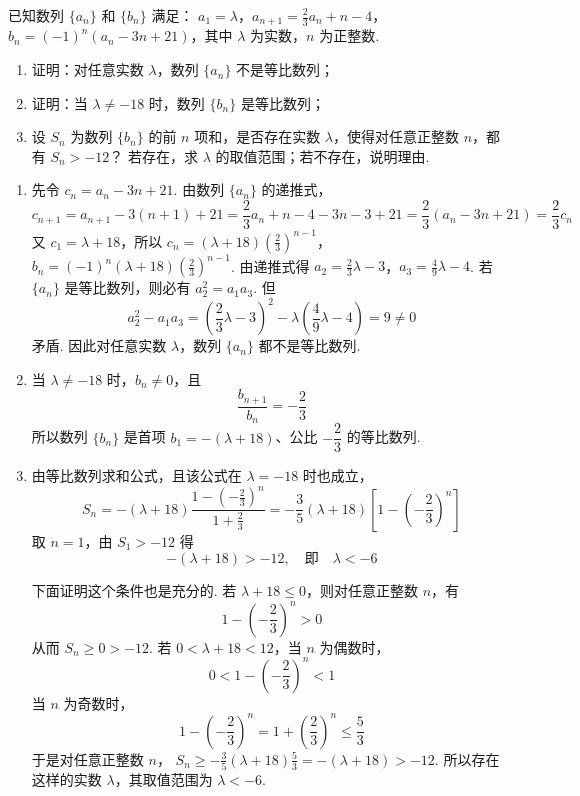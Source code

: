 \begin{problem}
已知数列 \(\{a_{n}\}\) 和 \(\{b_{n}\}\) 满足： \(a_1 = \lambda\)，\(a_{n + 1} = \frac{2}{3} a_n + n - 4\)，\(b_n = (-1)^n (a_n - 3n + 21)\)，其中 \(\lambda\) 为实数，\(n\) 为正整数.
\begin{enumerate}
\item 证明：对任意实数 \(\lambda\)，数列 \(\{a_{n}\}\) 不是等比数列；
\item 证明：当 \(\lambda \neq -18\) 时，数列 \(\{b_n\}\) 是等比数列；
\item 设 \(S_{n}\) 为数列 \(\{b_{n}\}\) 的前 \(n\) 项和，是否存在实数 \(\lambda\)，使得对任意正整数 \(n\)，都有 \(S_{n} > -12\)？ 若存在，求 \(\lambda\) 的取值范围；若不存在，说明理由.
\end{enumerate}
\end{problem}

\begin{solution}
\begin{enumerate}
\item 先令 \(c_n=a_n-3n+21\). 由数列 \(\{a_n\}\) 的递推式，
\[
c_{n+1}=a_{n+1}-3(n+1)+21
=\frac{2}{3}a_n+n-4-3n-3+21
=\frac{2}{3}(a_n-3n+21)=\frac{2}{3}c_n
\]
又 \(c_1=\lambda+18\)，所以
\(c_n=(\lambda+18)\left(\frac{2}{3}\right)^{n-1}\)，\(b_n=(-1)^n(\lambda+18)\left(\frac{2}{3}\right)^{n-1}\).
由递推式得
\(a_2=\frac{2}{3}\lambda-3\)，\(a_3=\frac{4}{9}\lambda-4\).
若 \(\{a_n\}\) 是等比数列，则必有 \(a_2^2=a_1a_3\). 但
\[
a_2^2-a_1a_3=\left(\frac{2}{3}\lambda-3\right)^2-\lambda\left(\frac{4}{9}\lambda-4\right)=9\ne0
\]
矛盾. 因此对任意实数 \(\lambda\)，数列 \(\{a_n\}\) 都不是等比数列.

\item 当 \(\lambda\ne-18\) 时，\(b_n\ne0\)，且
\[
\frac{b_{n+1}}{b_n}=-\frac{2}{3}
\]
所以数列 \(\{b_n\}\) 是首项 \(b_1=-(\lambda+18)\)、公比 \(-\dfrac{2}{3}\) 的等比数列.

\item 由等比数列求和公式，且该公式在 \(\lambda=-18\) 时也成立，
\[
S_n=-(\lambda+18)\frac{1-\left(-\frac{2}{3}\right)^n}{1+\frac{2}{3}}
=-\frac{3}{5}(\lambda+18)\left[1-\left(-\frac{2}{3}\right)^n\right]
\]
取 \(n=1\)，由 \(S_1>-12\) 得
\[
-(\lambda+18)>-12,
\quad\text{即}\quad \lambda<-6
\]

下面证明这个条件也是充分的. 若 \(\lambda+18\leqslant0\)，则对任意正整数 \(n\)，有
\[
1-\left(-\frac{2}{3}\right)^n>0
\]
从而 \(S_n\geqslant0>-12\). 若 \(0<\lambda+18<12\)，当 \(n\) 为偶数时，
\[
0<1-\left(-\frac{2}{3}\right)^n<1
\]
当 \(n\) 为奇数时，
\[
1-\left(-\frac{2}{3}\right)^n=1+\left(\frac{2}{3}\right)^n\leqslant\frac{5}{3}
\]
于是对任意正整数 \(n\)，
\(\displaystyle S_n\geqslant-\frac{3}{5}(\lambda+18)\frac{5}{3}=-(\lambda+18)>-12\).
所以存在这样的实数 \(\lambda\)，其取值范围为 \(\lambda<-6\).
\end{enumerate}
\end{solution}
